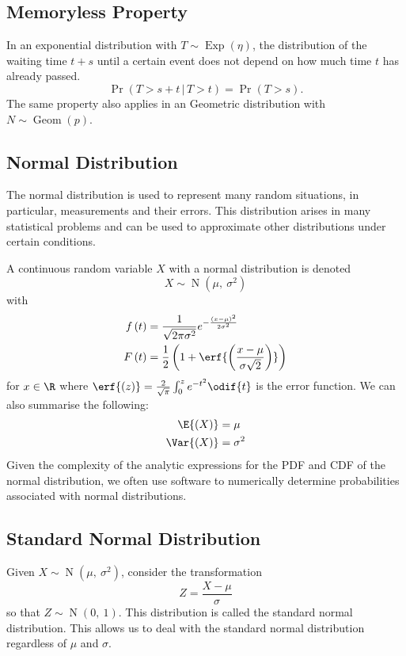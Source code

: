 \documentclass{article}
\begin{document}
\subsection{Memoryless Property}
In an exponential distribution with \(T \sim \operatorname{Exp}{\left( \eta \right)}\),
the distribution of the waiting time \(t + s\) until a certain event does not depend on
how much time \(t\) has already passed.
\begin{equation*}
    \Pr{\left( T > s + t \,\vert\, T > t \right)} = \Pr{\left( T > s \right)}.
\end{equation*}
The same property also applies in an Geometric distribution with \(N \sim \operatorname{Geom}{\left( p \right)}\).
\subsection{Normal Distribution}
The normal distribution is used to represent many random situations, in particular, measurements and their errors.
This distribution arises in many statistical problems and can be used to approximate other distributions
under certain conditions.

A continuous random variable \(X\) with a normal distribution is denoted
\begin{equation*}
    X \sim \operatorname{N}{\left( \mu,\: \sigma^2 \right)}
\end{equation*}
with
\begin{align*}
    f\left( t \right) & = \frac{1}{\sqrt{2 \pi \sigma^2}} e^{-\frac{\left( x - \mu \right)^2}{2 \sigma^2}}    \\
    F\left( t \right) & = \frac{1}{2} \left( 1 + \erf{\left( \frac{x - \mu}{\sigma \sqrt{2}} \right)} \right)
\end{align*}
for \(x \in \R\) where \(\erf{\left( z \right)} = \frac{2}{\sqrt{\pi}} \int_0^z e^{-t^2} \odif{t}\) is the error function.
We can also summarise the following:
\begin{align*}
    \E{\left( X \right)}   & = \mu      \\
    \Var{\left( X \right)} & = \sigma^2
\end{align*}
Given the complexity of the analytic expressions for the PDF and CDF of the normal distribution, we often
use software to numerically determine probabilities associated with normal distributions.
\subsection{Standard Normal Distribution}
Given \(X \sim \operatorname{N}{\left( \mu,\: \sigma^2 \right)}\), consider the transformation
\begin{equation*}
    Z = \frac{X - \mu}{\sigma}
\end{equation*}
so that \(Z \sim \operatorname{N}{\left( 0,\: 1 \right)}\). This distribution is called the standard normal distribution.
This allows us to deal with the standard normal distribution regardless of \(\mu\) and \(\sigma\).
\end{document}
